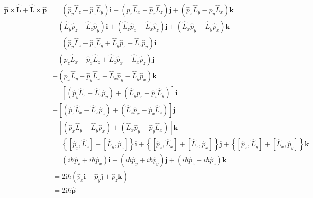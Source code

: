 \begin{equation}
    \begin{aligned}
        \hat{\mathbf{p}}\times \hat{\mathbf{L}}+\hat{\mathbf{L}}\times \hat{\mathbf{p}}&=\left( \hat{p}_y\hat{L}_z-\hat{p}_z\hat{L}_y \right) \boldsymbol{i}+\left( \hat{p}_z\hat{L}_x-\hat{p}_x\hat{L}_z \right) \boldsymbol{j}+\left( \hat{p}_x\hat{L}_y-\hat{p}_y\hat{L}_x \right) \boldsymbol{k}
\\
&+\left( \hat{L}_y\hat{p}_z-\hat{L}_z\hat{p}_y \right) \boldsymbol{i}+\left( \hat{L}_z\hat{p}_x-\hat{L}_x\hat{p}_z \right) \boldsymbol{j}+\left( \hat{L}_x\hat{p}_y-\hat{L}_y\hat{p}_x \right) \boldsymbol{k}
\\
&=\left( \hat{p}_y\hat{L}_z-\hat{p}_z\hat{L}_y+\hat{L}_y\hat{p}_z-\hat{L}_z\hat{p}_y \right) \boldsymbol{i}
\\
&+\left( \hat{p}_z\hat{L}_x-\hat{p}_x\hat{L}_z+\hat{L}_z\hat{p}_x-\hat{L}_x\hat{p}_z \right) \boldsymbol{j}
\\
&+\left( \hat{p}_x\hat{L}_y-\hat{p}_y\hat{L}_x+\hat{L}_x\hat{p}_y-\hat{L}_y\hat{p}_x \right) \boldsymbol{k}
\\
&=\left[ \left( \hat{p}_y\hat{L}_z-\hat{L}_z\hat{p}_y \right) +\left( \hat{L}_y\hat{p}_z-\hat{p}_z\hat{L}_y \right) \right] \boldsymbol{i}
\\
&+\left[ \left( \hat{p}_z\hat{L}_x-\hat{L}_x\hat{p}_z \right) +\left( \hat{L}_z\hat{p}_x-\hat{p}_x\hat{L}_z \right) \right] \boldsymbol{j}
\\
&+\left[ \left( \hat{p}_x\hat{L}_y-\hat{L}_y\hat{p}_x \right) +\left( \hat{L}_x\hat{p}_y-\hat{p}_y\hat{L}_x \right) \right] \boldsymbol{k}
\\
&=\left\{ \left[ \hat{p}_y,\hat{L}_z \right] +\left[ \hat{L}_y,\hat{p}_z \right] \right\} \boldsymbol{i}+\left\{ \left[ \hat{p}_z,\hat{L}_x \right] +\left[ \hat{L}_z,\hat{p}_x \right] \right\} \boldsymbol{j}+\left\{ \left[ \hat{p}_x,\hat{L}_y \right] +\left[ \hat{L}_x,\hat{p}_y \right] \right\} \boldsymbol{k}
\\
&=\left( i\hbar \hat{p}_x+i\hbar \hat{p}_x \right) \boldsymbol{i}+\left( i\hbar \hat{p}_y+i\hbar \hat{p}_y \right) \boldsymbol{j}+\left( i\hbar \hat{p}_z+i\hbar \hat{p}_z \right) \boldsymbol{k}
\\
&=2\mathrm{i}\hbar \left( \hat{p}_x\boldsymbol{i}+\hat{p}_y\boldsymbol{j}+\hat{p}_z\boldsymbol{k} \right) 
\\
&=2\mathrm{i}\hbar \hat{\boldsymbol{p}}
    \end{aligned}
\end{equation}


